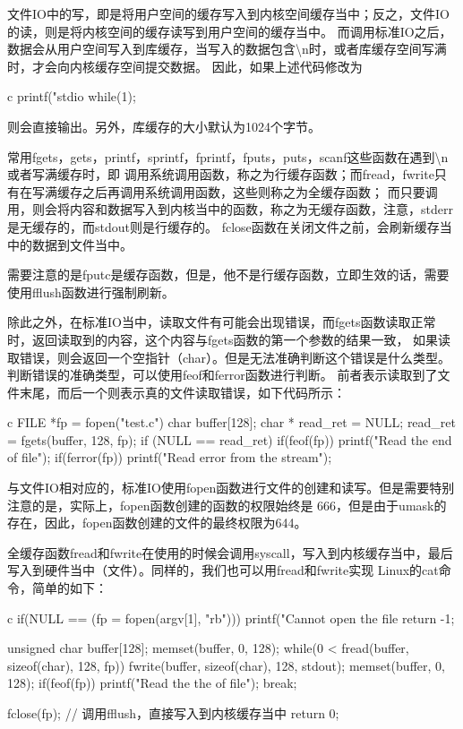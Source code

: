 文件IO中的写，即是将用户空间的缓存写入到内核空间缓存当中；反之，文件IO的读，则是将内核空间的缓存读写到用户空间的缓存当中。
而调用标准IO之后，数据会从用户空间写入到库缓存，当写入的数据包含\textbackslash n时，或者库缓存空间写满时，才会向内核缓存空间提交数据。
因此，如果上述代码修改为
\begin{code-block}{c}
printf("stdio %
while(1);
\end{code-block}
则会直接输出。另外，库缓存的大小默认为1024个字节。

常用fgets，gets，printf，sprintf，fprintf，fputs，puts，scanf这些函数在遇到\textbackslash n或者写满缓存时，即
调用系统调用函数，称之为行缓存函数；而fread，fwrite只有在写满缓存之后再调用系统调用函数，这些则称之为全缓存函数；
而只要调用，则会将内容和数据写入到内核当中的函数，称之为无缓存函数，注意，stderr是无缓存的，而stdout则是行缓存的。
fclose函数在关闭文件之前，会刷新缓存当中的数据到文件当中。

需要注意的是fputc是缓存函数，但是，他不是行缓存函数，立即生效的话，需要使用fflush函数进行强制刷新。

除此之外，在标准IO当中，读取文件有可能会出现错误，而fgets函数读取正常时，返回读取到的内容，这个内容与fgets函数的第一个参数的结果一致，
如果读取错误，则会返回一个空指针（char）。但是无法准确判断这个错误是什么类型。判断错误的准确类型，可以使用feof和ferror函数进行判断。
前者表示读取到了文件末尾，而后一个则表示真的文件读取错误，如下代码所示：
\begin{code-block}{c}
FILE *fp = fopen("test.c")
char buffer[128];
char * read_ret = NULL;
read_ret = fgets(buffer, 128, fp);
if (NULL == read_ret)
{
        if(feof(fp))
        {
                printf("Read the end of file\n");
        }
        if(ferror(fp))
        {
                printf("Read error from the stream\n");
        }
}
\end{code-block}

与文件IO相对应的，标准IO使用fopen函数进行文件的创建和读写。但是需要特别注意的是，实际上，fopen函数创建的函数的权限始终是
666，但是由于umask的存在，因此，fopen函数创建的文件的最终权限为644。

全缓存函数fread和fwrite在使用的时候会调用syscall，写入到内核缓存当中，最后写入到硬件当中（文件）。同样的，我们也可以用fread和fwrite实现
Linux的cat命令，简单的如下：
\begin{code-block}{c}
if(NULL == (fp = fopen(argv[1], "rb")))
{
        printf("Cannot open the file %
        return -1;
}

unsigned char buffer[128];
memset(buffer, 0, 128);
while(0 < fread(buffer, sizeof(char), 128, fp))
{
        fwrite(buffer, sizeof(char), 128, stdout);
        memset(buffer, 0, 128);
        if(feof(fp))
        {
                printf("Read the the of file\n");
                break;
        }
}

fclose(fp); // 调用fflush，直接写入到内核缓存当中
return 0;
\end{code-block}

